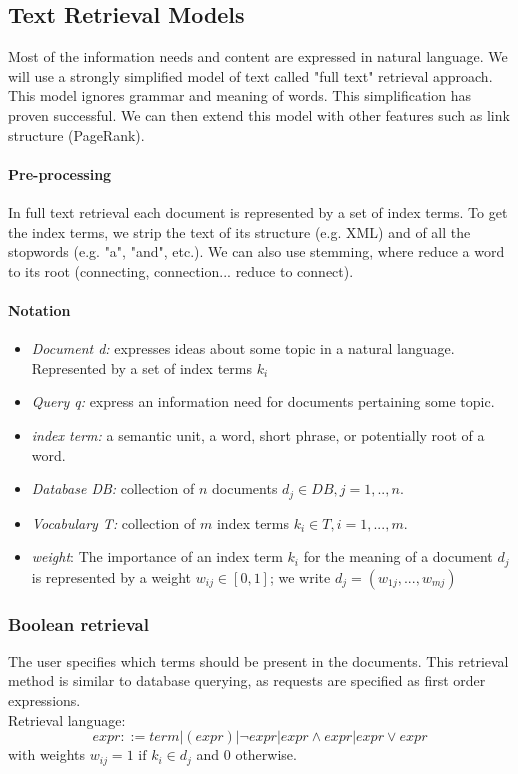 \subsection{Text Retrieval Models}

Most of the information needs and content are expressed in natural language. We will use a strongly simplified model of text called "full text" retrieval approach. This model ignores grammar and meaning of words. This simplification has proven successful. We can then extend this model with other features such as link structure (PageRank).


\paragraph{Pre-processing}

In full text retrieval each document is represented by a set of index terms. To get the index terms, we strip the text of its structure (e.g. XML) and of all the stopwords (e.g. "a", "and", etc.). We can also use stemming, where reduce a word to its root ({connecting, connection...} reduce to connect). 

\paragraph{Notation}
\begin{itemize}
\item \textit{Document d:} expresses ideas about some topic in a natural language. Represented by a set of index terms $k_i$
\item \textit{Query q:} express an information need for documents pertaining some topic.
\item \textit{index term:} a semantic unit, a word, short phrase, or potentially root of a word.
\item \textit{Database DB:} collection of $n$ documents $d_j \in DB, j=1,..,n$.
\item \textit{Vocabulary T:} collection of $m$ index terms $k_i \in T, i=1,...,m$.
\item \textit{weight}: The importance of an index term $k_i$ for the meaning of a document $d_j$ is represented by a weight $w_{ij} \in [0,1]$; we write $d_j = (w_{1j},...,w_{mj})$
\end{itemize}

\subsubsection{Boolean retrieval}
The user specifies which terms should be present in the documents. This retrieval method is similar to database querying, as requests are specified as first order expressions.
\\
Retrieval language:
\[ expr ::= term|(expr)|\neg expr|expr\land expr|expr \lor expr 
\]
with weights $w_{ij} = 1\text{ if }k_i \in d_j$ and $0$ otherwise.

